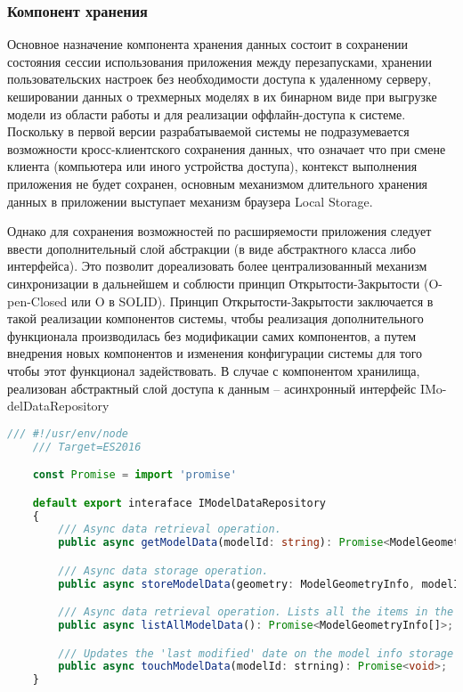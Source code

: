 \subsubsection{Компонент хранения}
\label{sub:theory:components:persistance}

Основное назначение компонента хранения данных состоит в сохранении состояния сессии использования приложения между перезапусками, хранении пользовательских настроек без необходимости доступа к
удаленному серверу, кешировании данных о трехмерных моделях в их бинарном виде при выгрузке модели из области работы и для реализации оффлайн-доступа к системе.
Поскольку в первой версии разрабатываемой системы не подразумевается возможности кросс-клиентского сохранения данных, что означает что при смене клиента (компьютера или иного устройства доступа),
контекст выполнения приложения не будет сохранен, основным механизмом длительного хранения данных в приложении выступает механизм браузера Local Storage.

Однако для сохранения возможностей по расширяемости приложения следует ввести дополнительный слой абстракции (в виде абстрактного класса либо интерфейса). Это позволит дореализовать более
централизованный механизм синхронизации в дальнейшем и соблюсти принцип Открытости-Закрытости (O-pen-Closed или O в SOLID). Принцип Открытости-Закрытости заключается в такой реализации
компонентов системы, чтобы реализация дополнительного функционала производилась без модификации самих компонентов, а путем внедрения новых компонентов и изменения конфигурации системы для того чтобы
этот функционал задействовать. В случае с компонентом хранилища, реализован абстрактный слой доступа к данным -- асинхронный интерфейс IMo-delDataRepository

 \begin{lstlisting}[language=TypeScript, label=lst:domain:html]
    /// #!/usr/env/node
    /// Target=ES2016

    const Promise = import 'promise'

    default export interaface IModelDataRepository
    {
        /// Async data retrieval operation.
        public async getModelData(modelId: string): Promise<ModelGeometryInfo>;

        /// Async data storage operation.
        public async storeModelData(geometry: ModelGeometryInfo, modelId: strning): Promise<void>;

        /// Async data retrieval operation. Lists all the items in the storage.
        public async listAllModelData(): Promise<ModelGeometryInfo[]>;

        /// Updates the 'last modified' date on the model info storage item.
        public async touchModelData(modelId: strning): Promise<void>;
    }
\end{lstlisting}

